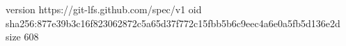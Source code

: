 version https://git-lfs.github.com/spec/v1
oid sha256:877e39b3c16f823062872c5a65d37f772c15fbb5b6c9eec4a6e0a5fb5d136e2d
size 608
